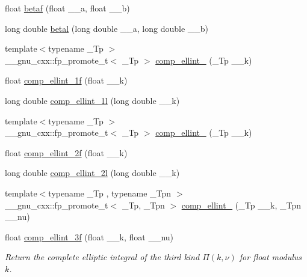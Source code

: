 \begin{DoxyCompactItemize}
\item 
float \hyperlink{group__cxx17__math__spec__func_ga12dc61ee4c09172151cf092ed387e203}{betaf} (float \+\_\+\+\_\+a, float \+\_\+\+\_\+b)
\item 
long double \hyperlink{group__cxx17__math__spec__func_ga8caca1cef099f41a88111209c36ce06c}{betal} (long double \+\_\+\+\_\+a, long double \+\_\+\+\_\+b)
\item 
{\footnotesize template$<$typename \+\_\+\+Tp $>$ }\\\+\_\+\+\_\+gnu\+\_\+cxx\+::fp\+\_\+promote\+\_\+t$<$ \+\_\+\+Tp $>$ \hyperlink{group__cxx17__math__spec__func_gad559217fb01e7a8b7a6e23eeedda64be}{comp\+\_\+ellint\+\_} (\+\_\+\+Tp \+\_\+\+\_\+k)
\item 
float \hyperlink{group__cxx17__math__spec__func_ga7fb5be999a8125cf7e55e630eb8444a1}{comp\+\_\+ellint\+\_\+1f} (float \+\_\+\+\_\+k)
\item 
long double \hyperlink{group__cxx17__math__spec__func_ga7247d3dd77c1ff5df3c059fed862dc48}{comp\+\_\+ellint\+\_\+1l} (long double \+\_\+\+\_\+k)
\item 
{\footnotesize template$<$typename \+\_\+\+Tp $>$ }\\\+\_\+\+\_\+gnu\+\_\+cxx\+::fp\+\_\+promote\+\_\+t$<$ \+\_\+\+Tp $>$ \hyperlink{group__cxx17__math__spec__func_gaadf288465eea84ec609d93de96200aaa}{comp\+\_\+ellint\+\_} (\+\_\+\+Tp \+\_\+\+\_\+k)
\item 
float \hyperlink{group__cxx17__math__spec__func_ga21700f2f125c42b1f1da1f9c7eea1135}{comp\+\_\+ellint\+\_\+2f} (float \+\_\+\+\_\+k)
\item 
long double \hyperlink{group__cxx17__math__spec__func_ga47b647ec386c8d4b18a030c97842df18}{comp\+\_\+ellint\+\_\+2l} (long double \+\_\+\+\_\+k)
\item 
{\footnotesize template$<$typename \+\_\+\+Tp , typename \+\_\+\+Tpn $>$ }\\\+\_\+\+\_\+gnu\+\_\+cxx\+::fp\+\_\+promote\+\_\+t$<$ \+\_\+\+Tp, \+\_\+\+Tpn $>$ \hyperlink{group__cxx17__math__spec__func_ga80419d323d3231870bd588525e818974}{comp\+\_\+ellint\+\_} (\+\_\+\+Tp \+\_\+\+\_\+k, \+\_\+\+Tpn \+\_\+\+\_\+nu)
\item 
float \hyperlink{group__cxx17__math__spec__func_ga76834d3112f777703330892303267a39}{comp\+\_\+ellint\+\_\+3f} (float \+\_\+\+\_\+k, float \+\_\+\+\_\+nu)
\begin{DoxyCompactList}\small\item\em Return the complete elliptic integral of the third kind $ \Pi(k,\nu) $ for {\ttfamily float} modulus $ k $. \end{DoxyCompactList}\item 

\end{DoxyCompactItemize}
